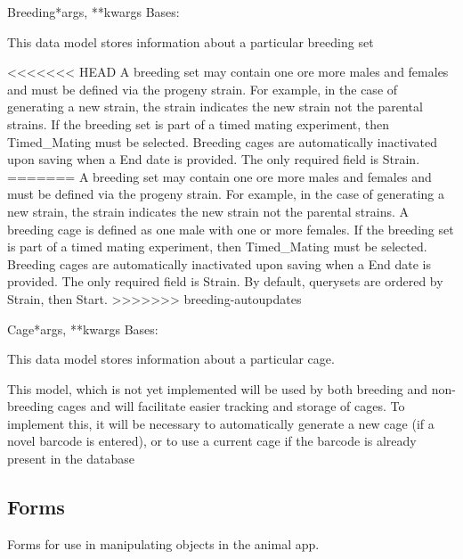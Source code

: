 \documentclass[letterpaper,10pt,english]{sphinxmanual}
\begin{document}
\hypertarget{animal.models.Breeding}{}\begin{classdesc}{Breeding}{*args, **kwargs}
Bases: 

This data model stores information about a particular breeding set

<<<<<<< HEAD
A breeding set may contain one ore more males and females and must be defined via the progeny strain.  For example, in the case of generating a new strain, the strain indicates the new strain not the parental strains.  If the breeding set is part of a timed mating experiment, then Timed\_Mating must be selected.  Breeding cages are automatically inactivated upon saving when a End date is provided.  The only required field is Strain.
=======
A breeding set may contain one ore more males and females and must be defined via the progeny strain.  For example, in the case of generating a new strain, the strain indicates the new strain not the parental strains.  A breeding cage is defined as one male with one or more females.  If the breeding set is part of a timed mating experiment, then Timed\_Mating must be selected.  Breeding cages are automatically inactivated upon saving when a End date is provided.  The only required field is Strain.  By default, querysets are ordered by Strain, then Start.
>>>>>>> breeding-autoupdates
\end{classdesc}

\hypertarget{animal.models.Cage}{}\begin{classdesc}{Cage}{*args, **kwargs}
Bases: 

This data model stores information about a particular cage.

This model, which is not yet implemented will be used by both breeding and non-breeding cages and will facilitate easier tracking and storage of cages.  To implement this, it will be necessary to automatically generate a new cage (if a novel barcode is entered), or to use a current cage if the barcode is already present in the database
\end{classdesc}


\subsection{Forms}
\hypertarget{module-animal.forms}{}
\modulesynopsis{}
Forms for use in manipulating objects in the animal app.
\end{document}
